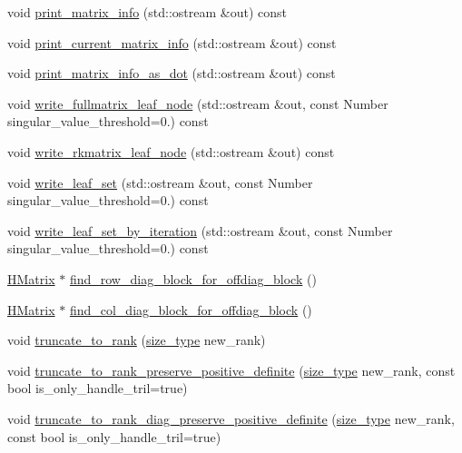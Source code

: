 \begin{DoxyCompactItemize}
\item 
void \hyperlink{classHMatrix_ad8f87883cf49080706233441c0e09171}{print\+\_\+matrix\+\_\+info} (std\+::ostream \&out) const
\item 
void \hyperlink{classHMatrix_aab0c393acf1c416ebc7ab05ca85d9e49}{print\+\_\+current\+\_\+matrix\+\_\+info} (std\+::ostream \&out) const
\item 
void \hyperlink{classHMatrix_ae904288a7e0ac82d9fd2364b1c150bc2}{print\+\_\+matrix\+\_\+info\+\_\+as\+\_\+dot} (std\+::ostream \&out) const
\item 
void \hyperlink{classHMatrix_a42f958a13c56d64564d59487e67bc8a2}{write\+\_\+fullmatrix\+\_\+leaf\+\_\+node} (std\+::ostream \&out, const Number singular\+\_\+value\+\_\+threshold=0.) const
\item 
void \hyperlink{classHMatrix_ac2c8ccd5763d3952505741c657b6468c}{write\+\_\+rkmatrix\+\_\+leaf\+\_\+node} (std\+::ostream \&out) const
\item 
void \hyperlink{classHMatrix_aaf0ae0960a40ad78a941aee823e80315}{write\+\_\+leaf\+\_\+set} (std\+::ostream \&out, const Number singular\+\_\+value\+\_\+threshold=0.) const
\item 
void \hyperlink{classHMatrix_aac1e1ddbfeb133520dcd50c0174aab8d}{write\+\_\+leaf\+\_\+set\+\_\+by\+\_\+iteration} (std\+::ostream \&out, const Number singular\+\_\+value\+\_\+threshold=0.) const
\item 
\hyperlink{classHMatrix}{H\+Matrix} $\ast$ \hyperlink{classHMatrix_a1da518d5ca7e685e3e787f58dcad4e61}{find\+\_\+row\+\_\+diag\+\_\+block\+\_\+for\+\_\+offdiag\+\_\+block} ()
\item 
\hyperlink{classHMatrix}{H\+Matrix} $\ast$ \hyperlink{classHMatrix_a1ab763860706b9cbef8f5e73d995f29a}{find\+\_\+col\+\_\+diag\+\_\+block\+\_\+for\+\_\+offdiag\+\_\+block} ()
\item 
void \hyperlink{classHMatrix_a64be687cacd167efc12b892aa154dcd3}{truncate\+\_\+to\+\_\+rank} (\hyperlink{classHMatrix_a5ca8dc549783d38371a01ecd621ecb34}{size\+\_\+type} new\+\_\+rank)
\item 
void \hyperlink{classHMatrix_a938473855f9e95358d00ee7ea14f6c51}{truncate\+\_\+to\+\_\+rank\+\_\+preserve\+\_\+positive\+\_\+definite} (\hyperlink{classHMatrix_a5ca8dc549783d38371a01ecd621ecb34}{size\+\_\+type} new\+\_\+rank, const bool is\+\_\+only\+\_\+handle\+\_\+tril=true)
\item 
void \hyperlink{classHMatrix_a421beeb0b30d63f286a7905db394bdab}{truncate\+\_\+to\+\_\+rank\+\_\+diag\+\_\+preserve\+\_\+positive\+\_\+definite} (\hyperlink{classHMatrix_a5ca8dc549783d38371a01ecd621ecb34}{size\+\_\+type} new\+\_\+rank, const bool is\+\_\+only\+\_\+handle\+\_\+tril=true)

\end{DoxyCompactItemize}
